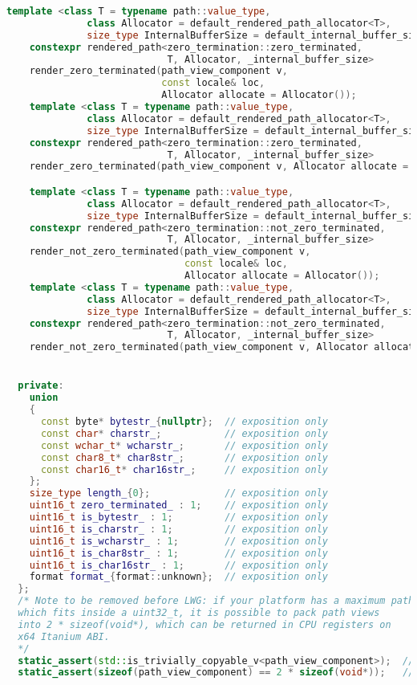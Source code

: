 \documentclass[11pt]{article}
\begin{document}
\begin{lstlisting}[language=cpp]
    template <class T = typename path::value_type,
              class Allocator = default_rendered_path_allocator<T>,
              size_type InternalBufferSize = default_internal_buffer_size>
    constexpr rendered_path<zero_termination::zero_terminated,
                            T, Allocator, _internal_buffer_size>
    render_zero_terminated(path_view_component v,
                           const locale& loc,
                           Allocator allocate = Allocator());
    template <class T = typename path::value_type,
              class Allocator = default_rendered_path_allocator<T>,
              size_type InternalBufferSize = default_internal_buffer_size>
    constexpr rendered_path<zero_termination::zero_terminated,
                            T, Allocator, _internal_buffer_size>
    render_zero_terminated(path_view_component v, Allocator allocate = Allocator());

    template <class T = typename path::value_type,
              class Allocator = default_rendered_path_allocator<T>,
              size_type InternalBufferSize = default_internal_buffer_size>
    constexpr rendered_path<zero_termination::not_zero_terminated,
                            T, Allocator, _internal_buffer_size>
    render_not_zero_terminated(path_view_component v,
                               const locale& loc,
                               Allocator allocate = Allocator());
    template <class T = typename path::value_type,
              class Allocator = default_rendered_path_allocator<T>,
              size_type InternalBufferSize = default_internal_buffer_size>
    constexpr rendered_path<zero_termination::not_zero_terminated,
                            T, Allocator, _internal_buffer_size>
    render_not_zero_terminated(path_view_component v, Allocator allocate = Allocator());


  private:
    union
    {
      const byte* bytestr_{nullptr};  // exposition only
      const char* charstr_;           // exposition only
      const wchar_t* wcharstr_;       // exposition only
      const char8_t* char8str_;       // exposition only
      const char16_t* char16str_;     // exposition only
    };
    size_type length_{0};             // exposition only
    uint16_t zero_terminated_ : 1;    // exposition only
    uint16_t is_bytestr_ : 1;         // exposition only
    uint16_t is_charstr_ : 1;         // exposition only
    uint16_t is_wcharstr_ : 1;        // exposition only
    uint16_t is_char8str_ : 1;        // exposition only
    uint16_t is_char16str_ : 1;       // exposition only
    format format_{format::unknown};  // exposition only
  };
  /* Note to be removed before LWG: if your platform has a maximum path size
  which fits inside a uint32_t, it is possible to pack path views
  into 2 * sizeof(void*), which can be returned in CPU registers on
  x64 Itanium ABI.
  */
  static_assert(std::is_trivially_copyable_v<path_view_component>);  // to be removed before LWG
  static_assert(sizeof(path_view_component) == 2 * sizeof(void*));   // to be removed before LWG


\end{lstlisting}
\end{document}
